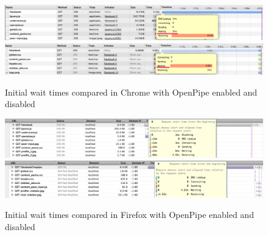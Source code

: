 \documentclass[12pt]{report}
\begin{document}
\begin{figure}[H]
\caption{Initial wait times compared in Chrome with OpenPipe enabled and disabled}
\label{fig:initialWaitTimesChrome}
\centering
\includegraphics[width=\textwidth,keepaspectratio]{figures/images/chrome_openpipe_ci_fakebook_enabled.png}
\includegraphics[width=\textwidth,keepaspectratio]{figures/images/chrome_openpipe_ci_fakebook_disabled.png}
\end{figure}

\begin{figure}[H]
\caption{Initial wait times compared in Firefox with OpenPipe enabled and disabled}
\label{fig:initialWaitTimesFirefox}
\centering
\includegraphics[width=\textwidth,keepaspectratio]{figures/images/ff_openpipe_ci_fakebook_enabled.png}
\includegraphics[width=\textwidth,keepaspectratio]{figures/images/ff_openpipe_ci_fakebook_disabled.png}
\end{figure}
\end{document}
